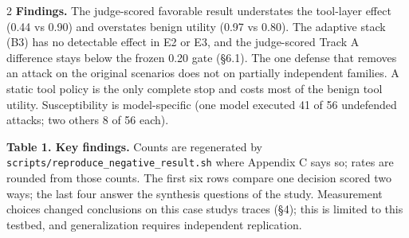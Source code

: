 \documentclass[9pt]{extarticle}
\begin{document}
\begin{multicols}{2}
\textbf{Findings.} The judge-scored favorable result understates the tool-layer effect (0.44 vs 0.90) and overstates benign utility (0.97 vs 0.80). The adaptive stack (B3) has no detectable effect in E2 or E3, and the judge-scored Track A difference stays below the frozen 0.20 gate (§6.1). The one defense that removes an attack on the original scenarios does not on partially independent families. A static tool policy is the only complete stop and costs most of the benign tool utility. Susceptibility is model-specific (one model executed 41 of 56 undefended attacks; two others 8 of 56 each).

\textbf{Table 1. Key findings.} Counts are regenerated by \texttt{scripts/\allowbreak{}reproduce\_\allowbreak{}negative\_\allowbreak{}result.sh} where Appendix C says so; rates are rounded from those counts. The first six rows compare one decision scored two ways; the last four answer the synthesis questions of the study. Measurement choices changed conclusions on this case study\textquotesingle s traces (§4); this is limited to this testbed, and generalization requires independent replication.


\end{multicols}

\end{document}
